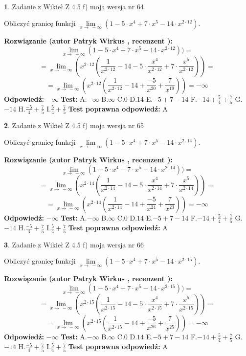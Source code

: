\documentclass[12pt, a4paper]{article}
\theoremstyle{definition} %
\newtheorem{zad}{}
\newcommand{\zadStart}[1]{\begin{zad}#1\newline}
\newcommand{\zadStop}{\end{zad}}
\newcommand{\rozwStart}[2]{\noindent \textbf{Rozwiązanie (autor #1 , recenzent #2): }\newline}
\newcommand{\rozwStop}{\newline}
\newcommand{\odpStart}{\noindent \textbf{Odpowiedź:}\newline}
\newcommand{\odpStop}{\newline}
\newcommand{\testStart}{\noindent \textbf{Test:}\newline}
\newcommand{\testStop}{\newline}
\newcommand{\kluczStart}{\noindent \textbf{Test poprawna odpowiedź:}\newline}
\newcommand{\kluczStop}{\newline}
\begin{document}
\zadStart{Zadanie z Wikieł Z 4.5 f) moja wersja nr 64}



Obliczyć granicę funkcji  $\lim\limits_{x\to\ -\infty}(1 - 5 \cdot x^{4}+7 \cdot x^{5}- 14 \cdot x^{2\cdot12})$.
\zadStop
\rozwStart{Patryk Wirkus}{}
$$\lim\limits_{x\to\ -\infty}(1 - 5 \cdot x^{4}+7 \cdot x^{5}- 14 \cdot x^{2\cdot12}))=$$
$$=\lim\limits_{x\to\ -\infty}(x^{2\cdot12}(\frac{1}{x^{2\cdot12}}-14 -5 \cdot \frac{x^{4}}{x^{2\cdot12}}+7 \cdot \frac{x^{5}}{x^{2\cdot12}}))=$$
$$=\lim\limits_{x\to\ -\infty}(x^{2\cdot12}(\frac{1}{x^{2\cdot12}}-14 + \frac{-5}{x^{20}}+ \frac{7}{x^{19}}))=-\infty$$
\rozwStop
\odpStart
$-\infty$
\odpStop
\testStart
A.$-\infty$ B.$\infty$ C.$0$ D.$14$ E.$-5 + 7 - 14$
F.$-14+\frac{5}{4}+\frac{7}{5}$ G.$-14$
H.$\frac{-5}{4}+\frac{7}{5}$
I.$\frac{5}{4}+\frac{7}{5}$
\testStop
\kluczStart
A
\kluczStop



\zadStart{Zadanie z Wikieł Z 4.5 f) moja wersja nr 65}



Obliczyć granicę funkcji  $\lim\limits_{x\to\ -\infty}(1 - 5 \cdot x^{4}+7 \cdot x^{5}- 14 \cdot x^{2\cdot14})$.
\zadStop
\rozwStart{Patryk Wirkus}{}
$$\lim\limits_{x\to\ -\infty}(1 - 5 \cdot x^{4}+7 \cdot x^{5}- 14 \cdot x^{2\cdot14}))=$$
$$=\lim\limits_{x\to\ -\infty}(x^{2\cdot14}(\frac{1}{x^{2\cdot14}}-14 -5 \cdot \frac{x^{4}}{x^{2\cdot14}}+7 \cdot \frac{x^{5}}{x^{2\cdot14}}))=$$
$$=\lim\limits_{x\to\ -\infty}(x^{2\cdot14}(\frac{1}{x^{2\cdot14}}-14 + \frac{-5}{x^{24}}+ \frac{7}{x^{23}}))=-\infty$$
\rozwStop
\odpStart
$-\infty$
\odpStop
\testStart
A.$-\infty$ B.$\infty$ C.$0$ D.$14$ E.$-5 + 7 - 14$
F.$-14+\frac{5}{4}+\frac{7}{5}$ G.$-14$
H.$\frac{-5}{4}+\frac{7}{5}$
I.$\frac{5}{4}+\frac{7}{5}$
\testStop
\kluczStart
A
\kluczStop



\zadStart{Zadanie z Wikieł Z 4.5 f) moja wersja nr 66}



Obliczyć granicę funkcji  $\lim\limits_{x\to\ -\infty}(1 - 5 \cdot x^{4}+7 \cdot x^{5}- 14 \cdot x^{2\cdot15})$.
\zadStop
\rozwStart{Patryk Wirkus}{}
$$\lim\limits_{x\to\ -\infty}(1 - 5 \cdot x^{4}+7 \cdot x^{5}- 14 \cdot x^{2\cdot15}))=$$
$$=\lim\limits_{x\to\ -\infty}(x^{2\cdot15}(\frac{1}{x^{2\cdot15}}-14 -5 \cdot \frac{x^{4}}{x^{2\cdot15}}+7 \cdot \frac{x^{5}}{x^{2\cdot15}}))=$$
$$=\lim\limits_{x\to\ -\infty}(x^{2\cdot15}(\frac{1}{x^{2\cdot15}}-14 + \frac{-5}{x^{26}}+ \frac{7}{x^{25}}))=-\infty$$
\rozwStop
\odpStart
$-\infty$
\odpStop
\testStart
A.$-\infty$ B.$\infty$ C.$0$ D.$14$ E.$-5 + 7 - 14$
F.$-14+\frac{5}{4}+\frac{7}{5}$ G.$-14$
H.$\frac{-5}{4}+\frac{7}{5}$
I.$\frac{5}{4}+\frac{7}{5}$
\testStop
\kluczStart
A
\kluczStop
\end{document}
